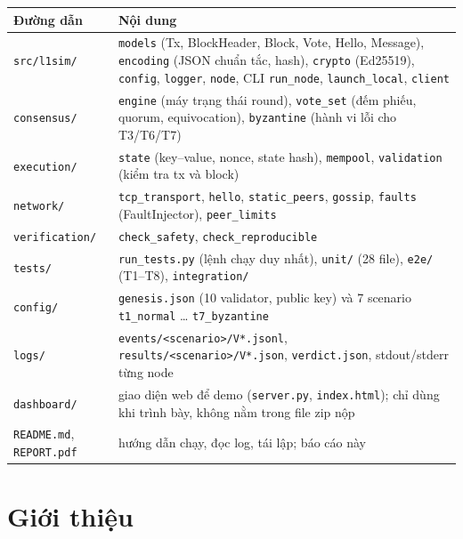 \documentclass[11pt,a4paper]{article}
\newcommand{\code}[1]{\texttt{#1}}
\begin{document}
\begin{table}[H]
\centering\small
\renewcommand{\arraystretch}{1.08}
\begin{tabularx}{\linewidth}{@{}L{4.4cm} Y@{}}
\toprule
\textbf{Đường dẫn} & \textbf{Nội dung} \\
\midrule
\code{src/l1sim/} & \code{models} (Tx, BlockHeader, Block, Vote, Hello, Message), \code{encoding} (JSON chuẩn tắc, hash), \code{crypto} (Ed25519), \code{config}, \code{logger}, \code{node}, CLI \code{run\_node}, \code{launch\_local}, \code{client} \\
\quad\code{consensus/} & \code{engine} (máy trạng thái round), \code{vote\_set} (đếm phiếu, quorum, equivocation), \code{byzantine} (hành vi lỗi cho T3/T6/T7) \\
\quad\code{execution/} & \code{state} (key--value, nonce, state hash), \code{mempool}, \code{validation} (kiểm tra tx và block) \\
\quad\code{network/} & \code{tcp\_transport}, \code{hello}, \code{static\_peers}, \code{gossip}, \code{faults} (FaultInjector), \code{peer\_limits} \\
\quad\code{verification/} & \code{check\_safety}, \code{check\_reproducible} \\
\code{tests/} & \code{run\_tests.py} (lệnh chạy duy nhất), \code{unit/} (28 file), \code{e2e/} (T1--T8), \code{integration/} \\
\code{config/} & \code{genesis.json} (10 validator, public key) và 7 scenario \code{t1\_normal} … \code{t7\_byzantine} \\
\code{logs/} & \code{events/<scenario>/V*.jsonl}, \code{results/<scenario>/V*.json}, \code{verdict.json}, stdout/stderr từng node \\
\code{dashboard/} & giao diện web để demo (\code{server.py}, \code{index.html}); chỉ dùng khi trình bày, không nằm trong file zip nộp \\
\code{README.md}, \code{REPORT.pdf} & hướng dẫn chạy, đọc log, tái lập; báo cáo này \\
\bottomrule
\end{tabularx}
\end{table}

\section{Giới thiệu}
\end{document}
